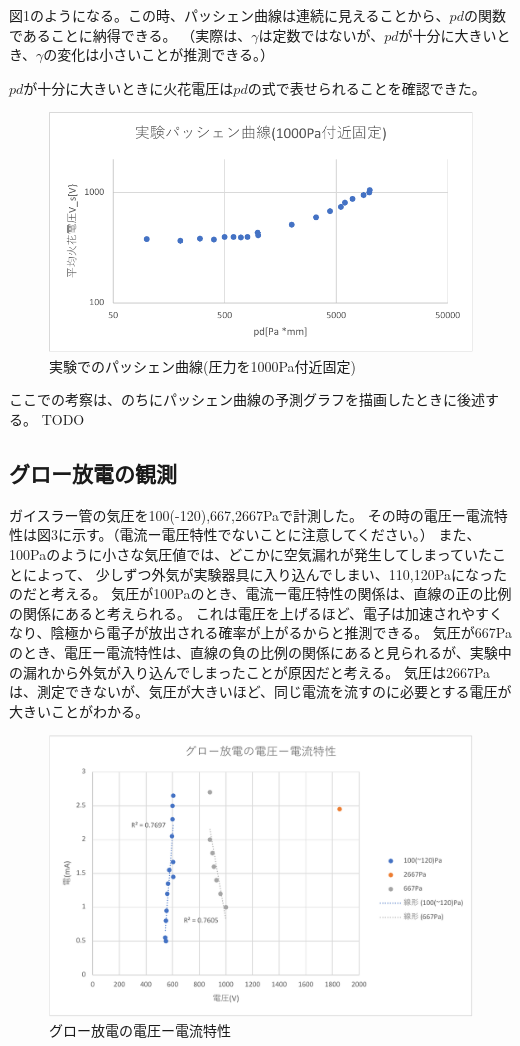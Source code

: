 \documentclass[a4j,twocolumn]{jsarticle}
\begin{document}
図1のようになる。この時、パッシェン曲線は連続に見えることから、$pd$の関数であることに納得できる。
（実際は、$\gamma$は定数ではないが、$pd$が十分に大きいとき、$\gamma$の変化は小さいことが推測できる。）

$pd$が十分に大きいときに火花電圧は$pd$の式で表せられることを確認できた。

\begin{figure}[htb]
    \centering
    \includegraphics[keepaspectratio,width=0.6\columnwidth]{fig/zu1.pdf}
    \caption{実験でのパッシェン曲線(圧力を1000Pa付近固定)}
\end{figure}


ここでの考察は、のちにパッシェン曲線の予測グラフを描画したときに後述する。
TODO

\subsection*{グロー放電の観測}

ガイスラー管の気圧を100(-120),667,2667Paで計測した。
その時の電圧ー電流特性は図3に示す。（電流ー電圧特性でないことに注意してください。）
また、100Paのように小さな気圧値では、どこかに空気漏れが発生してしまっていたことによって、
少しずつ外気が実験器具に入り込んでしまい、110,120Paになったのだと考える。
気圧が100Paのとき、電流ー電圧特性の関係は、直線の正の比例の関係にあると考えられる。
これは電圧を上げるほど、電子は加速されやすくなり、陰極から電子が放出される確率が上がるからと推測できる。
気圧が667Paのとき、電圧ー電流特性は、直線の負の比例の関係にあると見られるが、実験中の漏れから外気が入り込んでしまったことが原因だと考える。
気圧は2667Paは、測定できないが、気圧が大きいほど、同じ電流を流すのに必要とする電圧が大きいことがわかる。

\begin{figure}[htb]
    \centering
    \includegraphics[keepaspectratio,width=0.8\columnwidth]{fig/glow.pdf}
    \caption{グロー放電の電圧ー電流特性}
\end{figure}
\end{document}
